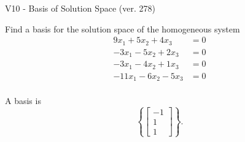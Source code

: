 \begin{exercise}
  \begin{exerciseTitle}V10 - Basis of Solution Space (ver. 278)\end{exerciseTitle}
  \begin{exerciseStatement}
    Find a basis for the solution space of the homogeneous system 
\begin{align*}
 9 x_ 1 + 5 x_ 2 + 4 x_ 3 &= 0  \\ 
  -3 x_ 1 -5 x_ 2 + 2 x_ 3 &= 0  \\ 
  -3 x_ 1 -4 x_ 2 + 1 x_ 3 &= 0  \\ 
  -11 x_ 1 -6 x_ 2 -5 x_ 3 &= 0  \\ 
 \end{align*}


 
  \end{exerciseStatement}

  \begin{exerciseAnswer}
   A basis is   
\[\left\{\left[\begin{array}{c}
-1 \\
1 \\
1
\end{array}\right]\right\}.\]

  


  \end{exerciseAnswer}
\end{exercise}